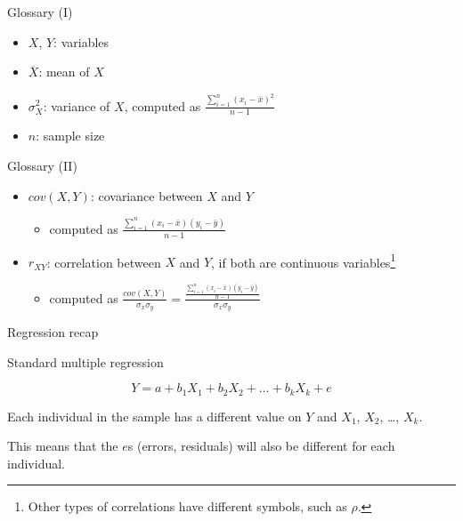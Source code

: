 \documentclass[12pt,english,pdf,xcolor=dvipsnames,aspectratio=169,handout]{beamer}\usepackage[]{graphicx}\usepackage[]{xcolor}
\begin{document}
\begin{frame}{Glossary (I)}

  \begin{itemize}
  \item $X$, $Y$: variables
  \item $\overline{X}$: mean of $X$
  \item $\sigma_X^2$: variance of $X$, computed as $\frac{\sum_{i=1}^n(x_i - \bar{x})^2}{n-1}$
  \item $n$: sample size
  \end{itemize}

\end{frame}



\begin{frame}{Glossary (II)}

  \begin{itemize}
  \item $cov(X,Y)$: covariance between $X$ and $Y$ 
  \begin{itemize}
    \item computed as $\frac{\sum\limits_{i=1}^n(x_i - \bar{x})(y_i - \bar{y})}{n-1}$
  \end{itemize}
  \item $r_{XY}$: correlation between $X$ and $Y$, if both are continuous variables\footnote{Other types of correlations have different symbols, such as $\rho$.}
  \begin{itemize}
    \item computed as $\frac{cov(X,Y)}{\sigma_x\sigma_y} = \frac{\frac{\sum\limits_{i=1}^n(x_i - \bar{x})(y_i - \bar{y})}{n-1}}{\sigma_x\sigma_y}$ 
  \end{itemize}
  \end{itemize}

\end{frame}



\begin{frame}
\begin{center}
    \Huge Regression recap
\end{center}
\end{frame}


\begin{frame}{Standard multiple regression}

\begin{equation}
Y = a + b_1X_1 + b_2X_2 + \dots + b_kX_k + e
\end{equation}

Each individual in the sample has a different value on $Y$ and $X_1$, $X_2$, \dots, $X_k$.\bigskip

This means that the $e$s (errors, residuals) will also be different for each individual.

\end{frame}
\end{document}
